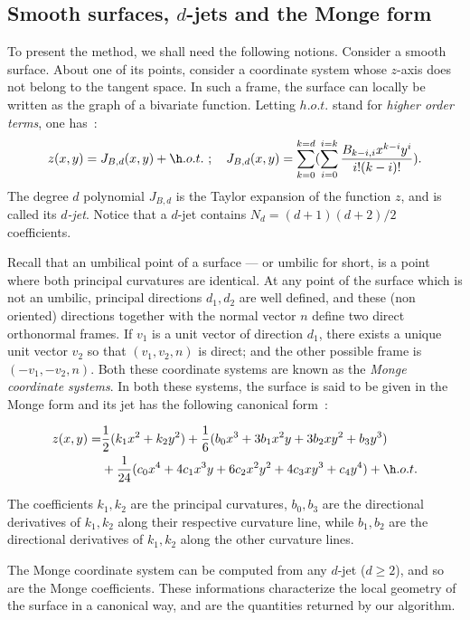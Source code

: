 \subsection{Smooth surfaces, $d$-jets and the Monge form}

To present the method, we shall need the following notions. Consider a
smooth surface.  About one of its points, consider a coordinate system
whose $z$-axis does not belong to the tangent space. In such a frame,
the surface can locally be written as the graph of a bivariate
function. Letting $h.o.t.$ stand for {\em higher order terms}, one
has~:
%
\begin{equation}
z(x,y)=J_{B,d}(x,y) + \h.o.t. \ ; \quad 
J_{B,d}(x,y)=\sum_{k=0}^{k=d}(\sum_{i=0}^{i=k}
\frac{B_{k-i,i}x^{k-i}y^{i}}{i!(k-i)!}).
\end{equation}
The degree $d$ polynomial $J_{B,d}$ is the Taylor expansion of the
function $z$, and is called its {\em $d$-jet}. Notice that a $d$-jet contains
$N_d=(d+1)(d+2)/2$ coefficients.

Recall that an umbilical point of a surface --- or umbilic for short,
is a point where both principal curvatures are identical.  At any
point of the surface which is not an umbilic, principal directions
$d_1, d_2$ are well defined, and these (non oriented) directions
together with the normal vector $n$ define two direct orthonormal
frames. If $v_1$ is a unit vector of direction $d_1$, there exists a
unique unit vector $v_2$ so that $(v_1,v_2,n)$ is direct; and the
other possible frame is $(-v_1,-v_2,n)$.  Both these coordinate
systems are known as the {\em Monge coordinate systems}. In both these
systems, the surface is said to be given in the Monge form and its jet
has the following canonical form~:

\begin{eqnarray}
\label{eq:monge}
z(x,y) =  & \frac{1}{2}(k_1x^2 + k_2y^2)+
	\frac{1}{6}(b_0x^3+3b_1x^2y+3b_2xy^2+b_3y^3) \\
  &  +\frac{1}{24}(c_0x^4+4c_1x^3y+6c_2x^2y^2+4c_3xy^3+c_4y^4) + \h.o.t.
\end{eqnarray}

The coefficients $k_1, k_2$ are the principal curvatures,
$b_0,b_3$ are the directional derivatives of $k_1,k_2$ along their
respective curvature line, while $b_1,b_2$ are the directional
derivatives of $k_1,k_2$ along the other curvature lines.

The Monge coordinate system can be computed from any $d$-jet ($d\geq
2$), and so are the Monge coefficients. These informations
characterize the local geometry of the surface in a canonical way, and
are the quantities returned by our algorithm.


